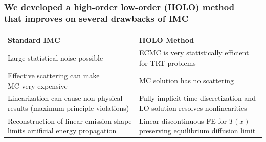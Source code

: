 \documentclass[xcolor=dvipsnames,hyperref={pdfpagelabels=false},unknownkeysallowed]{beamer}
\newcommand{\colb}[1]{{\color{blue} #1}}
\newcommand{\colG}[1]{{\color{Gray!110} #1}}
\newcommand{\colr}[1]{{\color{red} #1}}
\newlength{\tabsep}
\begin{document}
\begin{frame}
\frametitle{We developed a \colb{high-order low-order (HOLO) method} \\ that improves on several drawbacks of IMC}
    \begin{center}
{\footnotesize
\begin{tabular}{p{} p{}} 
    \multicolumn{1}{l}{\textbf{\normalsize Standard  IMC}} & \multicolumn{1}{l}{\textbf{\normalsize
    HOLO Method}} \\ \hline [2pt]
    \parbox{0.4\textwidth}{Large \colr{statistical noise} possible} & 
    \parbox{0.5\textwidth}{ECMC is \colb{very statistically efficient} \\for TRT problems} \\ [\tabsep]
 \parbox{0.4\textwidth}{{\color{red}Effective scattering} can make \\ MC  very expensive}
 & \parbox{0.4\textwidth}{MC solution has \colb{no
 scattering}} \\[\tabsep] 
 \parbox{0.5\textwidth}{Linearization can cause \colr{non-physical}\\ results  (maximum principle
 violations)} & \parbox{0.5\textwidth}{Fully \colb{implicit} time-discretization
 and \\ LO solution \colb{resolves nonlinearities}} \\[\tabsep] 
 \parbox{0.5\textwidth}{\colG{Reconstruction of linear emission shape limits artificial energy propagation}} &
 \parbox{0.5\textwidth}{Linear-discontinuous FE for $T(x)$ \\ preserving equilibrium diffusion limit} 
\end{tabular}
}
\end{center}
\end{frame}
\end{document}
